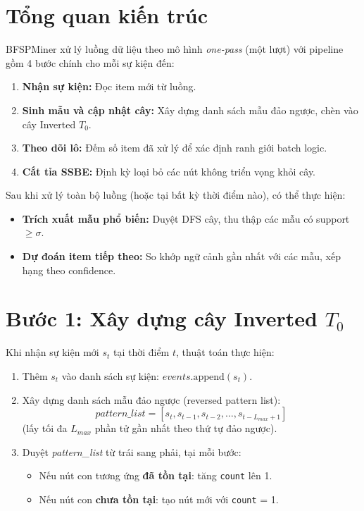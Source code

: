 \documentclass[a4paper,12pt]{report}
\begin{document}
\section{Tổng quan kiến trúc}

BFSPMiner xử lý luồng dữ liệu theo mô hình \textit{one-pass} (một lượt) với pipeline gồm 4 bước chính cho mỗi sự kiện đến:

\begin{enumerate}
    \item \textbf{Nhận sự kiện:} Đọc item mới từ luồng.
    \item \textbf{Sinh mẫu và cập nhật cây:} Xây dựng danh sách mẫu đảo ngược, chèn vào cây Inverted $T_0$.
    \item \textbf{Theo dõi lô:} Đếm số item đã xử lý để xác định ranh giới batch logic.
    \item \textbf{Cắt tỉa SSBE:} Định kỳ loại bỏ các nút không triển vọng khỏi cây.
\end{enumerate}

Sau khi xử lý toàn bộ luồng (hoặc tại bất kỳ thời điểm nào), có thể thực hiện:
\begin{itemize}
    \item \textbf{Trích xuất mẫu phổ biến:} Duyệt DFS cây, thu thập các mẫu có support $\geq \sigma$.
    \item \textbf{Dự đoán item tiếp theo:} So khớp ngữ cảnh gần nhất với các mẫu, xếp hạng theo confidence.
\end{itemize}

\section{Bước 1: Xây dựng cây Inverted $T_0$}
\label{sec:build_tree}

Khi nhận sự kiện mới $s_t$ tại thời điểm $t$, thuật toán thực hiện:

\begin{enumerate}
    \item Thêm $s_t$ vào danh sách sự kiện: $\textit{events}.\text{append}(s_t)$.
    \item Xây dựng danh sách mẫu đảo ngược (reversed pattern list):
    \begin{equation}
        \textit{pattern\_list} = [s_t, s_{t-1}, s_{t-2}, \dots, s_{t-L_{max}+1}]
    \end{equation}
    (lấy tối đa $L_{max}$ phần tử gần nhất theo thứ tự đảo ngược).
    \item Duyệt \textit{pattern\_list} từ trái sang phải, tại mỗi bước:
    \begin{itemize}
        \item Nếu nút con tương ứng \textbf{đã tồn tại}: tăng \texttt{count} lên 1.
        \item Nếu nút con \textbf{chưa tồn tại}: tạo nút mới với \texttt{count} = 1.
    \end{itemize}
\end{enumerate}
\end{document}
